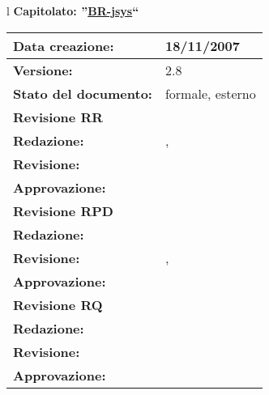 

\newcommand{\lv}{2.8} %
\newcommand{\dt}{ Analisi Dei Requisiti }%


\begin{center}
\thispagestyle{plain}
\begin{table}[htbp]
\large{
\begin{tabular}{l}
\Large{\textbf{\textsf{Capitolato: ''\underline{BR-jsys}``}}} \\
\begin{tabular}{|p{6cm}|p{6cm}|} \hline
\textbf{Data creazione:} & 18/11/2007 \\ \hline
\textbf{Versione:} & \lv \\ \hline
\textbf{Stato del documento:} & formale, esterno \\ \hline
\textbf{Revisione RR} &   \\ \hline
\textbf{Redazione:} & \MB, \AT \\ \hline
\textbf{Revisione:} &   \MT \\ \hline
\textbf{Approvazione:}  & \ET \\ \hline
\textbf{Revisione RPD} &  \\ \hline 
\textbf{Redazione:} & \MT \\ \hline
\textbf{Revisione:} &  \AT, \MB \\ \hline
\textbf{Approvazione:}  & \ET \\ \hline
\textbf{Revisione RQ} &   \\ \hline
\textbf{Redazione:} & \ET \\ \hline
\textbf{Revisione:} & \\ \hline
\textbf{Approvazione:}  & \\ \hline

\end{tabular} \\
\end{tabular}
}
\end{table}


\end{center}
